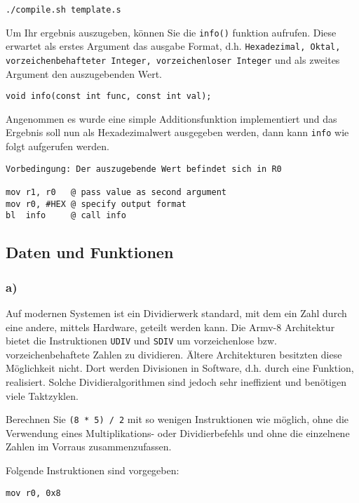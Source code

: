 \documentclass[12pt]{article}
\begin{document}
\begin{lstlisting}
./compile.sh template.s
\end{lstlisting}

Um Ihr ergebnis auszugeben, können Sie die \texttt{info()} funktion aufrufen.
Diese erwartet als erstes Argument das ausgabe Format, d.h.
\texttt{Hexadezimal, Oktal, vorzeichenbehafteter Integer, vorzeichenloser
Integer} und als zweites Argument den auszugebenden Wert.

\begin{lstlisting}
void info(const int func, const int val);
\end{lstlisting}

Angenommen es wurde eine simple Additionsfunktion implementiert und das Ergebnis
soll nun als Hexadezimalwert ausgegeben werden, dann kann \texttt{info} wie
folgt aufgerufen werden.

\begin{lstlisting}
Vorbedingung: Der auszugebende Wert befindet sich in R0

mov r1, r0   @ pass value as second argument
mov r0, #HEX @ specify output format
bl  info     @ call info
\end{lstlisting}


\subsection{Daten und Funktionen}
\subsubsection{a)}
Auf modernen Systemen ist ein Dividierwerk standard, mit dem ein Zahl durch eine
andere, mittels Hardware, geteilt werden kann. Die Armv-8 Architektur bietet
die Instruktionen \texttt{UDIV} und \texttt{SDIV} um vorzeichenlose bzw.
vorzeichenbehaftete Zahlen zu dividieren. Ältere Architekturen besitzten diese
Möglichkeit nicht. Dort werden Divisionen in Software, d.h. durch eine Funktion, realisiert. 
Solche Dividieralgorithmen sind jedoch sehr ineffizient und benötigen viele
Taktzyklen.

Berechnen Sie \texttt{(8 * 5) / 2} mit so wenigen Instruktionen wie
möglich, ohne die Verwendung eines Multiplikations- oder Dividierbefehls und
ohne die einzelnene Zahlen im Vorraus zusammenzufassen.

Folgende Instruktionen sind vorgegeben:
\begin{lstlisting}
mov r0, 0x8
\end{lstlisting}
\end{document}
